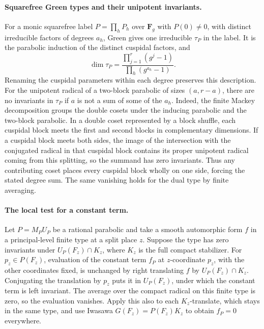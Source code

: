 \paragraph{Squarefree Green types and their unipotent invariants.}
\leavevmode{}%
For a monic squarefree label \(P=\prod_hP_h\) over \(\mathbf F_g\)
with \(P(0)\ne0\),
with distinct irreducible factors of degrees \(a_h\), Green
gives one irreducible \(\tau_P\) in the label. It is the
parabolic induction of the distinct cuspidal factors, and
\begin{equation}
 \label{eq:squarefree-green-degree}
 \dim\tau_P=\frac{\prod_{j=1}^r(g^j-1)}{\prod_h(g^{a_h}-1)} .
\end{equation}
Renaming the cuspidal parameters within each degree preserves
this description. For the unipotent radical of a two-block
parabolic of sizes \((a,r-a)\), there are no invariants in
\(\tau_P\) if \(a\) is not a sum of some of the \(a_h\).
Indeed, the finite Mackey decomposition groups the double
cosets under the inducing parabolic and the two-block
parabolic. In a double coset represented by a block shuffle,
each cuspidal block meets the first and second blocks in
complementary dimensions. If a cuspidal block meets both sides,
the image of the intersection with the conjugated radical in
that cuspidal block contains its proper unipotent radical
coming from this splitting, so the summand has zero invariants.
Thus any contributing coset places every cuspidal block wholly
on one side, forcing the stated degree sum. The same vanishing
holds for the dual type by finite averaging.
\cite[Introduction, \S7 Theorem~12 and \S8 Theorems~13--14]{tr3green}

\paragraph{The local test for a constant term.}
\leavevmode{}%
Let \(P=M_PU_P\) be a rational parabolic and take a smooth
automorphic form \(f\) in a principal-level finite type at a
split place \(z\). Suppose the type has zero invariants under
\(U_P(F_z)\cap K_z\), where \(K_z\) is the full compact
stabilizer. For \(p_z\in P(F_z)\), evaluation of the constant
term \(f_P\) at \(z\)-coordinate \(p_z\), with the other
coordinates fixed, is unchanged by right translating \(f\) by
\(U_P(F_z)\cap K_z\). Conjugating the translation by \(p_z\)
puts it in \(U_P(F_z)\), under which the constant term is left
invariant. The average over the compact radical on this finite
type is zero, so the evaluation vanishes. Apply this also to
each \(K_z\)-translate, which stays in the same type, and use
Iwasawa \(G(F_z)=P(F_z)K_z\) to obtain \(f_P=0\) everywhere.

